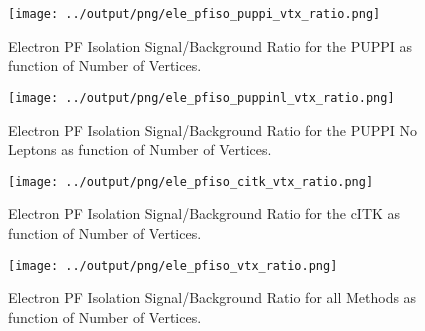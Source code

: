 \documentclass[11pt]{book}
\begin{document}
\begin{figure}[htb]
\centering
\texttt{[image: ../output/png/ele\_pfiso\_puppi\_vtx\_ratio.png]}
\caption{Electron PF Isolation Signal/Background Ratio for the PUPPI as function of Number of Vertices.}
\label{fig:ele_pfiso_vtx_ratio_puppi}
\end{figure}

\begin{figure}[htb]
\centering
\texttt{[image: ../output/png/ele\_pfiso\_puppinl\_vtx\_ratio.png]}
\caption{Electron PF Isolation Signal/Background Ratio for the PUPPI No Leptons as function of Number of Vertices.}
\label{fig:ele_pfiso_vtx_ratio_puppinl}
\end{figure}

\begin{figure}[htb]
\centering
\texttt{[image: ../output/png/ele\_pfiso\_citk\_vtx\_ratio.png]}
\caption{Electron PF Isolation Signal/Background Ratio for the cITK as function of Number of Vertices.}
\label{fig:ele_pfiso_vtx_ratio_citk}
\end{figure}

\begin{figure}[htb]
\centering
\texttt{[image: ../output/png/ele\_pfiso\_vtx\_ratio.png]}
\caption{Electron PF Isolation Signal/Background Ratio for all Methods as function of Number of Vertices.}
\label{fig:ele_pfiso_vtx_ratio}
\end{figure}
\clearpage


\end{document}
